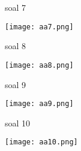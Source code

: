 \documentclass{article}
\begin{document}
soal 7
\begin{center}
    \texttt{[image: aa7.png]}
\end{center}

soal 8
\begin{center}
    \texttt{[image: aa8.png]}
\end{center}

soal 9
\begin{center}
    \texttt{[image: aa9.png]}
\end{center}

soal 10
\begin{center}
    \texttt{[image: aa10.png]}
\end{center}
\end{document}

